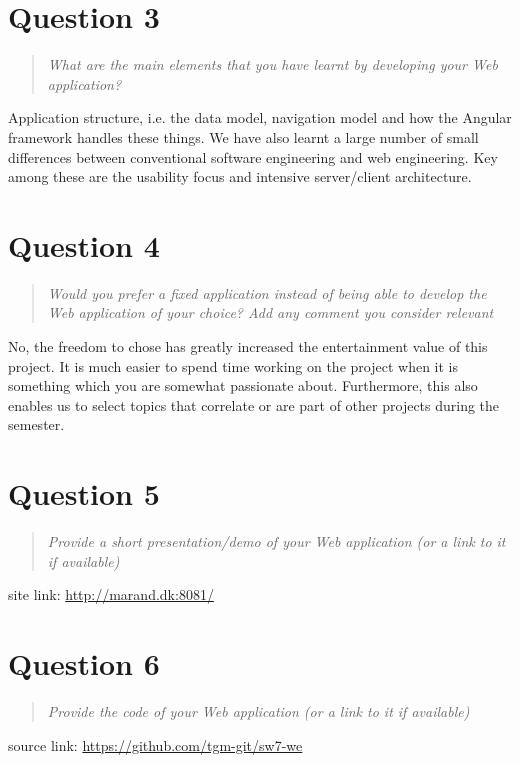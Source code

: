 \documentclass[10pt,a4paper]{report}
\begin{document}
\section{Question 3}
\begin{quote}
\textit{What are the main elements that you have learnt by developing your Web application?}
\end{quote}

Application structure, i.e. the data model, navigation model and how the Angular framework handles these things. We have also learnt a large number of small differences between conventional software engineering and web engineering. Key among these are the usability focus and intensive server/client architecture.

\section{Question 4}
\begin{quote}
\textit{Would you prefer a fixed application instead of being able to develop the Web application of your choice? Add any comment you consider relevant}
\end{quote}

No, the freedom to chose has greatly increased the entertainment value of this project. It is much easier to spend time working on the project when it is something which you are somewhat passionate about. Furthermore, this also enables us to select topics that correlate or are part of other projects during the semester.

\section{Question 5}
\begin{quote}
\textit{Provide a short presentation/demo of your Web application (or a link to it if available)}
\end{quote}

site link: \url{http://marand.dk:8081/}

\section{Question 6}
\begin{quote}
\textit{Provide the code of your Web application (or a link to it if available)}
\end{quote}

source link: \url{https://github.com/tgm-git/sw7-we}
\end{document}
